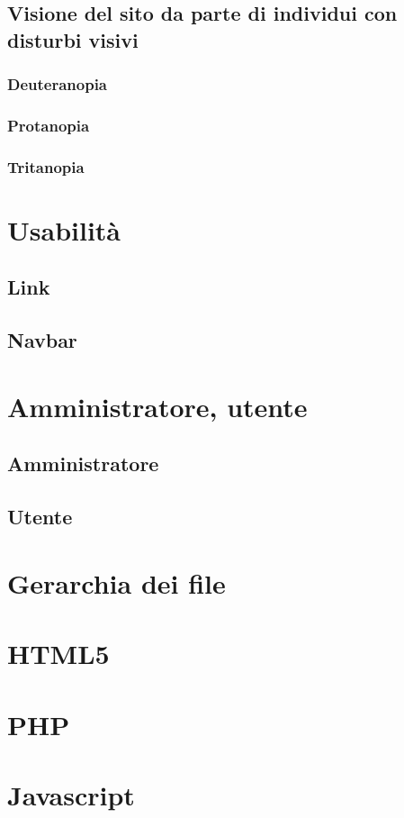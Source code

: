 \documentclass[10pt, a4paper]{article}
\begin{document}
\subsection{Visione del sito da parte di individui con disturbi visivi}
\subsubsection{Deuteranopia}
\subsubsection{Protanopia}
\subsubsection{Tritanopia}
\section{Usabilità}
\subsection{Link}
\subsection{Navbar}
\section{Amministratore, utente}
\subsection{Amministratore}
\subsection{Utente}
\section{Gerarchia dei file}
\section{HTML5}
\section{PHP}
\section{Javascript}
\end{document}
